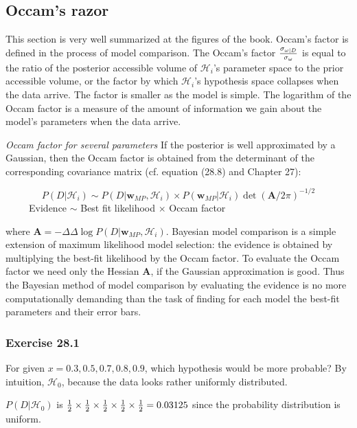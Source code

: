 \documentclass[a4paper,11pt]{article}
\newcommand{\vect}[1]{\boldsymbol{\mathbf{#1}}}
\numberwithin{equation}{section}
\begin{document}
{\begin{figure}
\end{figure}


\subsection{Occam's razor}

This section is very well summarized at the figures of the book. Occam's factor is defined in the process of model comparison. The Occam's factor ${\sigma_{\omega|D}\over \sigma_{\omega}}$ is equal to the ratio of the posterior accessible volume of $\mathcal{H}_i$'s parameter space to the prior accessible volume, or the factor by which $\mathcal{H}_i$'s hypothesis space collapses when the data arrive. The factor is smaller as the model is simple. The logarithm of the Occam factor is a measure of the amount of
information we gain about the model's parameters when the data arrive.

{\it Occam factor for several parameters}
If the posterior is well approximated by a Gaussian, then the Occam factor
is obtained from the determinant of the corresponding covariance matrix (cf.
equation (28.8) and Chapter 27):

$$
P(D|\mathcal{H}_i) \sim P(D|\vect w_{MP}, \mathcal{H}_i) \times P(\vect w_{MP}| \mathcal{H}_i) \det (\vect A/2\pi)^{-1/2}
$$ 
$~~~~~~~~~~~$Evidence $\sim$ Best fit likelihood $\times$ Occam factor

where $\vect A = -\Delta \Delta \log P(D|\vect w_{MP}, \mathcal{H}_i)$. Bayesian model comparison is a simple extension of maximum likelihood model selection: the evidence is obtained by multiplying the best-fit likelihood by the Occam factor. To evaluate the Occam factor we need only the Hessian $\vect A$, if the Gaussian
approximation is good. Thus the Bayesian method of model comparison by
evaluating the evidence is no more computationally demanding than the task
of finding for each model the best-fit parameters and their error bars.


\subsubsection{Exercise 28.1}

For given $x= 0.3,0.5,0.7,0.8,0.9$, which hypothesis would be more probable? By intuition, $\mathcal{H}_0$, because the data looks rather uniformly distributed. 

$P(D|\mathcal{H}_0)$ is ${1 \over 2}\times {1 \over 2} \times{1 \over 2} \times{1 \over 2}\times {1 \over 2}  = 0.03125$ since the probability distribution is uniform. 

}
\end{document}

